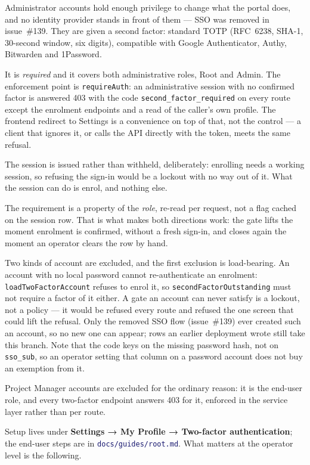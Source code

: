 \documentclass[12pt,a4paper,twoside]{report}
\newcommand{\code}[1]{\texttt{#1}}
\newcommand{\file}[1]{\texttt{\textcolor{MidnightBlue}{#1}}}
\begin{document}
Administrator accounts hold enough privilege to change what the portal does, and
no identity provider stands in front of them --- SSO was removed in issue~\#139.
They are given a second factor:
standard TOTP (RFC~6238, SHA-1, 30-second window, six digits), compatible with
Google Authenticator, Authy, Bitwarden and 1Password.

It is \emph{required} and it covers both administrative roles, Root and Admin.
The enforcement point is \code{requireAuth}: an administrative session with no
confirmed factor is answered 403 with the code
\code{second\_factor\_required} on every route except the enrolment endpoints
and a read of the caller's own profile. The frontend redirect to Settings is a
convenience on top of that, not the control — a client that ignores it, or calls
the API directly with the token, meets the same refusal.

The session is issued rather than withheld, deliberately: enrolling needs a
working session, so refusing the sign-in would be a lockout with no way out of
it. What the session can do is enrol, and nothing else.

The requirement is a property of the \emph{role}, re-read per request, not a flag
cached on the session row. That is what makes both directions work: the gate
lifts the moment enrolment is confirmed, without a fresh sign-in, and closes
again the moment an operator clears the row by hand.

Two kinds of account are excluded, and the first exclusion is load-bearing. An
account with no local password cannot re-authenticate an enrolment:
\code{loadTwoFactorAccount} refuses to enrol it, so
\code{secondFactorOutstanding} must not require a factor of it either. A gate an
account can never satisfy is a lockout, not a policy — it would be refused every
route and refused the one screen that could lift the refusal. Only the removed
SSO flow (issue~\#139) ever created such an account, so no new one can appear;
rows an earlier deployment wrote still take this branch. Note that the code keys
on the missing password hash, not on \code{sso\_sub}, so an operator setting
that column on a password account does not buy an exemption from it.

Project Manager accounts are excluded for the ordinary reason: it is the end-user
role, and every two-factor endpoint answers 403 for it, enforced in the service
layer rather than per route.

Setup lives under \textbf{Settings → My Profile → Two-factor authentication};
the end-user steps are in \file{docs/guides/root.md}. What matters at the
operator level is the following.
\end{document}
